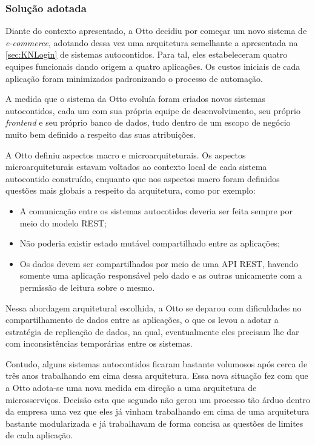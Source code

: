 \subsubsection{Solução adotada}

Diante do contexto apresentado, a Otto decidiu por começar um novo sistema de \textit{e-commerce},
adotando dessa vez uma arquitetura semelhante a apresentada na \autoref{sec:KNLogin} de sistemas autocontidos. Para
tal, eles estabeleceram quatro equipes funcionais dando origem a quatro aplicações. Os custos
iniciais de cada aplicação foram minimizados padronizando o processo de automação.

A medida que o sistema da Otto evoluía foram criados novos sistemas autocontidos, cada um com sua própria equipe
de desenvolvimento, seu próprio \textit{frontend} e seu próprio
banco de dados, tudo dentro de um escopo de negócio muito bem definido a respeito das suas
atribuições.

A Otto definiu aspectos macro e microarquiteturais. Os aspectos
microarquiteturais estavam voltados ao contexto local de cada sistema autocontido construído,
enquanto que nos aspectos macro foram definidos questões mais globais a respeito da arquitetura, como por exemplo:

\begin{itemize}
    \item A comunicação entre os sistemas autocotidos deveria ser feita sempre por meio do modelo
        \gls{REST};
    \item Não poderia existir estado mutável compartilhado entre as aplicações;
    \item Os dados devem ser compartilhados por meio de uma \gls{API} \gls{REST}, havendo somente
        uma aplicação responsável pelo dado e as outras unicamente com a permissão de leitura sobre o
        mesmo.
\end{itemize}

Nessa abordagem arquitetural escolhida, a Otto se deparou com dificuldades no compartilhamento
de dados entre as aplicações, o que os levou a adotar a estratégia de replicação de dados, na qual,
eventualmente eles precisam lhe dar com inconsistências temporárias entre os sistemas.

Contudo, alguns sistemas autocontidos ficaram bastante volumosos após cerca de três anos trabalhando
em cima dessa arquitetura. Essa nova situação fez com que a Otto adota-se uma nova medida em direção
a uma arquitetura de microsserviços. Decisão esta que segundo 
não gerou um processo tão árduo dentro da empresa uma vez que eles já vinham trabalhando em cima de
uma arquitetura bastante modularizada e já trabalhavam de forma concisa as questões de limites de
cada aplicação.


